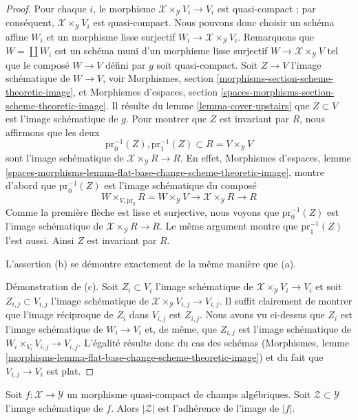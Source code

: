 \begin{proof}
\medskip\noindent
Pour chaque $i$, le morphisme $\mathcal{X} \times_\mathcal{Y} V_i \to V_i$
est quasi-compact ; par conséquent, $\mathcal{X} \times_\mathcal{Y} V_i$ est
quasi-compact. Nous pouvons donc choisir un schéma affine $W_i$ et un
morphisme lisse surjectif $W_i \to \mathcal{X} \times_\mathcal{Y} V_i$.
Remarquons que $W = \coprod W_i$ est un schéma muni d'un
morphisme lisse surjectif $W \to \mathcal{X} \times_\mathcal{Y} V$
tel que le composé $W \to V$ défini par $g$ soit quasi-compact.
Soit $Z \to V$ l'image schématique de $W \to V$, voir
Morphismes, section
\ref{morphisms-section-scheme-theoretic-image}, et
Morphismes d'espaces, section
\ref{spaces-morphisms-section-scheme-theoretic-image}.
Il résulte du lemme \ref{lemma-cover-upstairs}
que $Z \subset V$ est l'image schématique de $g$.
Pour montrer que $Z$ est invariant par $R$, nous affirmons que les deux
$$
\text{pr}_0^{-1}(Z), \text{pr}_1^{-1}(Z) \subset R = V \times_\mathcal{Y} V
$$
sont l'image schématique de $\mathcal{X} \times_\mathcal{Y} R \to R$.
En effet, Morphismes d'espaces, lemme
\ref{spaces-morphisms-lemma-flat-base-change-scheme-theoretic-image},
montre d'abord que $\text{pr}_0^{-1}(Z)$ est l'image schématique
du composé
$$
W \times_{V, \text{pr}_0} R = W \times_\mathcal{Y} V \to
\mathcal{X} \times_\mathcal{Y} R \to R
$$
Comme la première flèche est lisse et surjective, nous voyons que
$\text{pr}_0^{-1}(Z)$ est l'image schématique de
$\mathcal{X} \times_\mathcal{Y} R \to R$. Le même argument montre que
$\text{pr}_1^{-1}(Z)$ l'est aussi. Ainsi $Z$ est invariant par $R$.

\medskip\noindent
L'assertion (b) se démontre exactement de la même manière que (a).

\medskip\noindent
Démonstration de (c). Soit $Z_i \subset V_i$ l'image schématique
de $\mathcal{X} \times_\mathcal{Y} V_i \to V_i$ et soit
$Z_{i, j} \subset V_{i, j}$ l'image schématique de
$\mathcal{X} \times_\mathcal{Y} V_{i, j} \to V_{i, j}$.
Il suffit clairement de montrer que l'image réciproque de $Z_i$
dans $V_{i, j}$ est $Z_{i, j}$. Nous avons vu ci-dessus que
$Z_i$ est l'image schématique de $W_i \to V_i$
et, de même, que $Z_{i, j}$ est l'image
schématique de $W_i \times_{V_i} V_{i, j} \to V_{i, j}$.
L'égalité résulte donc du cas des schémas
(Morphismes, lemme
\ref{morphisms-lemma-flat-base-change-scheme-theoretic-image})
et du fait que $V_{i, j} \to V_i$ est plat.
\end{proof}

\begin{lemma}
\label{lemma-topology-scheme-theoretic-image}
Soit $f : \mathcal{X} \to \mathcal{Y}$ un morphisme quasi-compact
de champs algébriques. Soit $\mathcal{Z} \subset \mathcal{Y}$
l'image schématique de $f$. Alors $|\mathcal{Z}|$
est l'adhérence de l'image de $|f|$.
\end{lemma}

